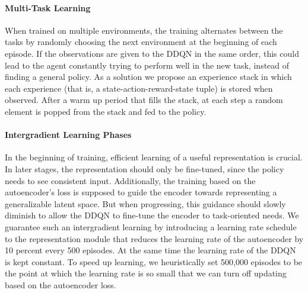 \paragraph{Multi-Task Learning} When trained on multiple environments, the training alternates between the tasks by randomly choosing the next environment at the beginning of each episode. If the observations are given to the DDQN in the same order, this could lead to the agent constantly trying to perform well in the new task, instead of finding a general policy. As a solution we propose an experience stack in which each experience (that is, a state-action-reward-state tuple) is stored when observed. After a warm up period that fills the stack, at each step a random element is popped from the stack and fed to the policy.

\paragraph{Intergradient Learning Phases} In the beginning of training, efficient learning of a useful representation is crucial. In later stages, the representation should only be fine-tuned, since the policy needs to see consistent input. Additionally, the training based on the autoencoder's loss is supposed to guide the encoder towards representing a generalizable latent space. But when progressing, this guidance should slowly diminish to allow the DDQN to fine-tune the encoder to task-oriented needs. We guarantee such an intergradient learning by introducing a learning rate schedule to the representation module that reduces the learning rate of the autoencoder by 10 percent every 500 episodes. At the same time the learning rate of the DDQN is kept constant. To speed up learning, we heuristically set 500,000 episodes to be the point at which the learning rate is so small that we can turn off updating based on the autoencoder loss. 

